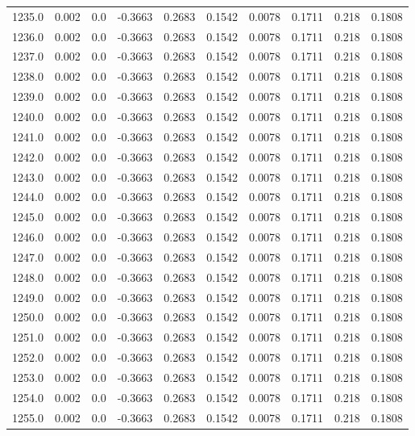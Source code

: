 \begin{longtable}{lrrrrrrrrr}
1235.0 & 0.002 & 0.0 & -0.3663 & 0.2683 & 0.1542 & 0.0078 & 0.1711 & 0.218 & 0.1808 \\
1236.0 & 0.002 & 0.0 & -0.3663 & 0.2683 & 0.1542 & 0.0078 & 0.1711 & 0.218 & 0.1808 \\
1237.0 & 0.002 & 0.0 & -0.3663 & 0.2683 & 0.1542 & 0.0078 & 0.1711 & 0.218 & 0.1808 \\
1238.0 & 0.002 & 0.0 & -0.3663 & 0.2683 & 0.1542 & 0.0078 & 0.1711 & 0.218 & 0.1808 \\
1239.0 & 0.002 & 0.0 & -0.3663 & 0.2683 & 0.1542 & 0.0078 & 0.1711 & 0.218 & 0.1808 \\
1240.0 & 0.002 & 0.0 & -0.3663 & 0.2683 & 0.1542 & 0.0078 & 0.1711 & 0.218 & 0.1808 \\
1241.0 & 0.002 & 0.0 & -0.3663 & 0.2683 & 0.1542 & 0.0078 & 0.1711 & 0.218 & 0.1808 \\
1242.0 & 0.002 & 0.0 & -0.3663 & 0.2683 & 0.1542 & 0.0078 & 0.1711 & 0.218 & 0.1808 \\
1243.0 & 0.002 & 0.0 & -0.3663 & 0.2683 & 0.1542 & 0.0078 & 0.1711 & 0.218 & 0.1808 \\
1244.0 & 0.002 & 0.0 & -0.3663 & 0.2683 & 0.1542 & 0.0078 & 0.1711 & 0.218 & 0.1808 \\
1245.0 & 0.002 & 0.0 & -0.3663 & 0.2683 & 0.1542 & 0.0078 & 0.1711 & 0.218 & 0.1808 \\
1246.0 & 0.002 & 0.0 & -0.3663 & 0.2683 & 0.1542 & 0.0078 & 0.1711 & 0.218 & 0.1808 \\
1247.0 & 0.002 & 0.0 & -0.3663 & 0.2683 & 0.1542 & 0.0078 & 0.1711 & 0.218 & 0.1808 \\
1248.0 & 0.002 & 0.0 & -0.3663 & 0.2683 & 0.1542 & 0.0078 & 0.1711 & 0.218 & 0.1808 \\
1249.0 & 0.002 & 0.0 & -0.3663 & 0.2683 & 0.1542 & 0.0078 & 0.1711 & 0.218 & 0.1808 \\
1250.0 & 0.002 & 0.0 & -0.3663 & 0.2683 & 0.1542 & 0.0078 & 0.1711 & 0.218 & 0.1808 \\
1251.0 & 0.002 & 0.0 & -0.3663 & 0.2683 & 0.1542 & 0.0078 & 0.1711 & 0.218 & 0.1808 \\
1252.0 & 0.002 & 0.0 & -0.3663 & 0.2683 & 0.1542 & 0.0078 & 0.1711 & 0.218 & 0.1808 \\
1253.0 & 0.002 & 0.0 & -0.3663 & 0.2683 & 0.1542 & 0.0078 & 0.1711 & 0.218 & 0.1808 \\
1254.0 & 0.002 & 0.0 & -0.3663 & 0.2683 & 0.1542 & 0.0078 & 0.1711 & 0.218 & 0.1808 \\
1255.0 & 0.002 & 0.0 & -0.3663 & 0.2683 & 0.1542 & 0.0078 & 0.1711 & 0.218 & 0.1808 \\

\end{longtable}
